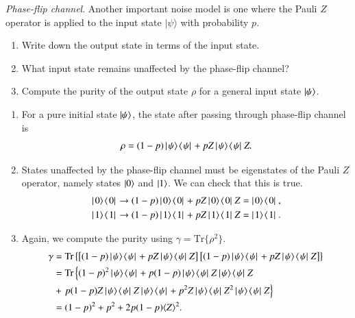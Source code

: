 \begin{exercise}
\emph{Phase-flip channel}. Another important noise model is one where the Pauli $Z$ operator is applied to the input state $|\psi\rangle$ with probability $p$.
\begin{enumerate}[label=(\alph*)]
    \item Write down the output state in terms of the input state.
    \item What input state remains unaffected by the phase-flip channel?
    \item Compute the purity of the output state $\rho$ for a general input state $\left| \psi \right\rangle$.
\end{enumerate}
\end{exercise}
\begin{solution}
\begin{enumerate}[label=(\alph*)]
    \item For a pure initial state $\left| \psi \right\rangle$, the state after passing through phase-flip channel is
    \begin{equation*}
        \rho = (1-p)\left|\left. \psi \rangle\right.\!\langle\left. \psi \right|\right.  + p Z\left|\left. \psi \rangle\right.\!\langle\left. \psi \right|\right. Z.
    \end{equation*}
    \item States unaffected by the phase-flip channel must be eigenstates of the Pauli $Z$ operator, namely states $\left| 0 \right\rangle$ and $\left| 1 \right\rangle$. We can check that this is true.
    \begin{align*}
        \outp{0}{0} & \rightarrow (1-p)\outp{0}{0} + pZ\outp{0}{0}Z = \outp{0}{0}, \\
        \outp{1}{1} & \rightarrow (1-p)\outp{1}{1} + pZ\outp{1}{1}Z = \outp{1}{1}.
    \end{align*}
    \item Again, we compute the purity using $\gamma=\text{Tr}\{\rho^2\}$. 
    \begin{align*}
        \gamma & = \text{Tr}\left\{ \left[ (1 - p) \outp{\psi}{\psi} + p Z\outp{\psi}{\psi}Z \right] \left[ (1 - p) \outp{\psi}{\psi} + p Z\outp{\psi}{\psi}Z \right] \right\} \\
        & = \text{Tr}\left\{ (1-p)^2\outp{\psi}{\psi} +p(1-p)\outp{\psi}{\psi}Z\outp{\psi}{\psi}Z \right. \\
        & + \left. p(1-p)Z\outp{\psi}{\psi}Z\outp{\psi}{\psi} + p^2 Z\outp{\psi}{\psi}Z^2\outp{\psi}{\psi}Z \right\} \\
        & = (1-p)^2 + p^2 + 2p(1-p)\av{Z}^2.
    \end{align*}
\end{enumerate}
\end{solution}